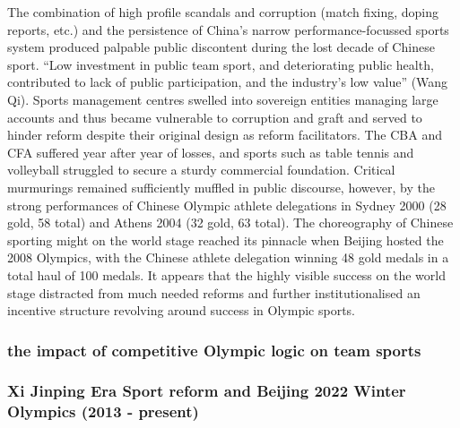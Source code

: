\begin{CJK}{UTF8}{gbsn}
The combination of high profile scandals and corruption (match fixing, doping reports, etc.) and the persistence of China's narrow performance-focussed sports system produced palpable public discontent during the lost decade of Chinese sport. ``Low investment in public team sport, and deteriorating public health, contributed to lack of public participation, and the industry’s low value'' (Wang Qi). Sports management centres swelled into sovereign entities managing large accounts and thus became vulnerable to corruption and graft and served to hinder reform despite their original design as reform facilitators. The CBA and CFA suffered year after year of losses, and sports such as table tennis and volleyball struggled to secure a sturdy commercial foundation. Critical murmurings remained sufficiently muffled in public discourse, however, by the strong performances of Chinese Olympic athlete delegations in Sydney 2000 (28 gold, 58 total) and Athens 2004 (32 gold, 63 total). The choreography of Chinese sporting might on the world stage reached its pinnacle when Beijing hosted the 2008 Olympics, with the Chinese athlete delegation winning 48 gold medals in a total haul of 100 medals.  It appears that the highly visible success on the world stage distracted from much needed reforms and further institutionalised an incentive structure revolving around success in Olympic sports.

\subsubsection{the impact of competitive Olympic logic on team sports}







\subsubsection{Xi Jinping Era Sport reform and Beijing 2022 Winter Olympics (2013 - present)}


\end{CJK}
